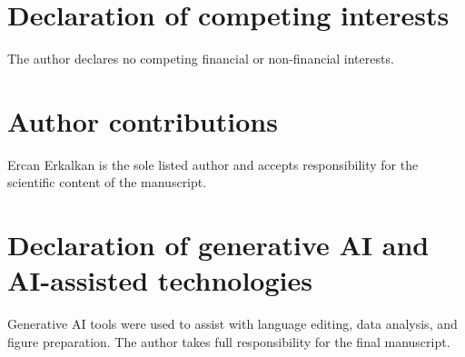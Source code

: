 \documentclass[preprint,12pt]{elsarticle}
\theoremstyle{definition}\newtheorem{definition}{Definition}
\theoremstyle{plain}\newtheorem{theorem}{Theorem}
\theoremstyle{plain}\newtheorem{lemma}{Lemma}
\theoremstyle{plain}\newtheorem{corollary}{Corollary}
\theoremstyle{plain}\newtheorem{assumption}{Assumption}
\theoremstyle{remark}\newtheorem{remark}[theorem]{Remark}
\begin{document}
\section*{Declaration of competing interests}
The author declares no competing financial or non-financial interests.

\section*{Author contributions}
Ercan Erkalkan is the sole listed author and accepts responsibility for the scientific content of the manuscript.

\section*{Declaration of generative AI and AI-assisted technologies}
Generative AI tools were used to assist with language editing, data analysis, and figure preparation. The author takes full responsibility for the final manuscript.



\end{document}
